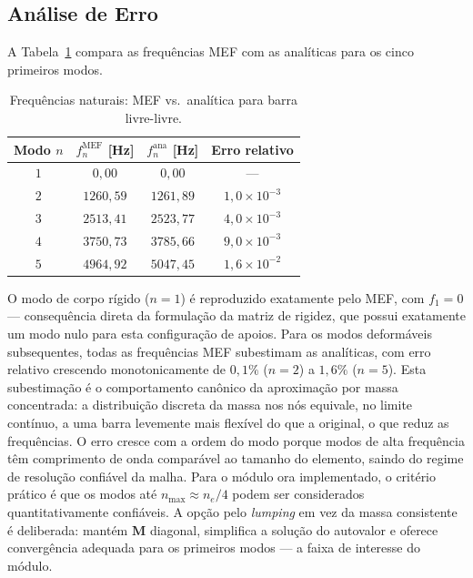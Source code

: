 \subsection{Análise de Erro}

A Tabela~\ref{tab:val_vibracao_erros} compara as frequências MEF com as analíticas para os cinco primeiros modos.

\begin{table}[htbp]
    \centering
    \caption{Frequências naturais: MEF vs.\ analítica para barra livre-livre.}
    \label{tab:val_vibracao_erros}
    \begin{tabular}{cccc}
        \hline
        \textbf{Modo} $n$ & $f_n^{\text{MEF}}$ [Hz] & $f_n^{\text{ana}}$ [Hz] & \textbf{Erro relativo} \\
        \hline
        $1$ & $0{,}00$   & $0{,}00$   & ---                      \\
        $2$ & $1260{,}59$ & $1261{,}89$ & $1{,}0 \times 10^{-3}$ \\
        $3$ & $2513{,}41$ & $2523{,}77$ & $4{,}0 \times 10^{-3}$ \\
        $4$ & $3750{,}73$ & $3785{,}66$ & $9{,}0 \times 10^{-3}$ \\
        $5$ & $4964{,}92$ & $5047{,}45$ & $1{,}6 \times 10^{-2}$ \\
        \hline
    \end{tabular}
\end{table}

O modo de corpo rígido ($n = 1$) é reproduzido exatamente pelo MEF, com $f_1 = 0$ --- consequência direta da formulação da matriz de rigidez, que possui exatamente um modo nulo para esta configuração de apoios. Para os modos deformáveis subsequentes, todas as frequências MEF subestimam as analíticas, com erro relativo crescendo monotonicamente de $0{,}1\%$ ($n = 2$) a $1{,}6\%$ ($n = 5$). Esta subestimação é o comportamento canônico da aproximação por massa concentrada: a distribuição discreta da massa nos nós equivale, no limite contínuo, a uma barra levemente mais flexível do que a original, o que reduz as frequências. O erro cresce com a ordem do modo porque modos de alta frequência têm comprimento de onda comparável ao tamanho do elemento, saindo do regime de resolução confiável da malha. Para o módulo ora implementado, o critério prático é que os modos até $n_{\max} \approx n_e / 4$ podem ser considerados quantitativamente confiáveis. A opção pelo \emph{lumping} em vez da massa consistente é deliberada: mantém $\mathbf{M}$ diagonal, simplifica a solução do autovalor e oferece convergência adequada para os primeiros modos --- a faixa de interesse do módulo.

